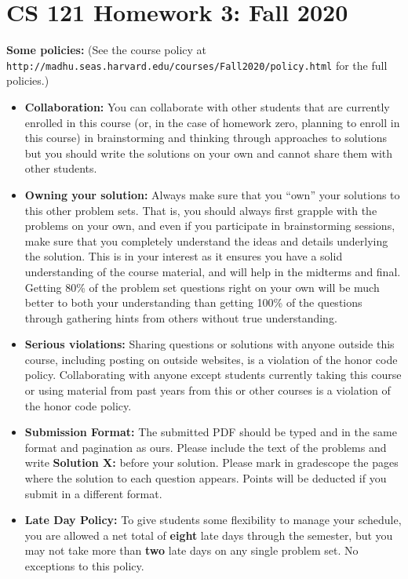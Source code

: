 \documentclass[11pt]{article}
\begin{document}
	
	\section*{CS 121 Homework 3: Fall
		2020}\label{cs-121-homework-zero-fall-2020}
	
	\textbf{Some policies:} (See the course policy at  {\tt http://madhu.seas.harvard.edu/courses/Fall2020/policy.html} for the
	full policies.)
	
	\begin{itemize}
		\item
		{\bf Collaboration:} You can collaborate with other students that are currently enrolled in
		this course (or, in the case of homework zero, planning to enroll in
		this course) in brainstorming and thinking through approaches to
		solutions but you should write the solutions on your own and cannot
		share them with other students. 
		\item
		{\bf Owning your solution:} Always make sure that you ``own'' your solutions to this other problem
		sets. That is, you should always first grapple with the problems on
		your own, and even if you participate in brainstorming sessions, make
		sure that you completely understand the ideas and details underlying
		the solution. This is in your interest as it ensures you have a solid
		understanding of the course material, and will help in the midterms
		and final. Getting 80\% of the problem
		set questions right on your own will be much better to both your
		understanding than getting 100\% of the questions through
		gathering hints from others without true understanding.
		\item
		{\bf Serious violations:} Sharing questions or solutions with anyone outside this course,
		including posting on outside websites, is a violation of the honor
		code policy. Collaborating with anyone except students currently
		taking this course or using material from past years from this or
		other courses is a violation of the honor code policy.
		\item
		{\bf Submission Format:} The submitted PDF should be typed and in the same format and
		pagination as ours. Please include the text of the problems and write
		\textbf{Solution X:} before your solution. Please mark in gradescope 
		the pages where
		the solution to each question appears. Points will be deducted if you
		submit in a different format.
		\item {\bf Late Day Policy:} To give students some flexibility to manage your schedule, you are allowed a net total of {\bf eight} late days through the semester, but you may not take more than {\bf two} late days on any single problem set. No exceptions to this policy. 
	\end{itemize}
	
\end{document}

